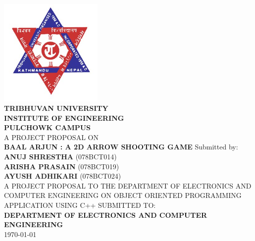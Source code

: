 
\begin{titlepage}
	
	\newcommand{\HRule}{\rule{\linewidth}{0.3mm}}
	\centering
	\vfill
	\includegraphics[width=50mm]{images/tu.jpg}\\[0.75cm]
	\textsc{\Large \bfseries  TRIBHUVAN UNIVERSITY}\\[0.25cm] %
	\textsc{\Large \bfseries INSTITUTE OF ENGINEERING}\\[0.25cm]
	\textsc{\Large \bfseries  PULCHOWK CAMPUS}\\
	\vfill
	\large {A PROJECT PROPOSAL ON }\\
	\Large \textbf{BAAL ARJUN : A 2D ARROW SHOOTING GAME}
	\vfill
	\large
	Submitted by:\\
	\textbf{ANUJ SHRESTHA} (078BCT014)\\
	\textbf{ARISHA PRASAIN} (078BCT019)\\
	\textbf{AYUSH ADHIKARI} (078BCT024)\\[0.5cm]
	\vfill
	\large
	A PROJECT PROPOSAL TO THE DEPARTMENT OF ELECTRONICS AND COMPUTER
	ENGINEERING ON OBJECT ORIENTED PROGRAMMING APPLICATION USING
	C++
	\vfill
	SUBMITTED TO:\\
	\textbf{DEPARTMENT OF ELECTRONICS AND COMPUTER ENGINEERING}
	\\
	\vfill
	{\large \today}
	\vfill
\end{titlepage}
